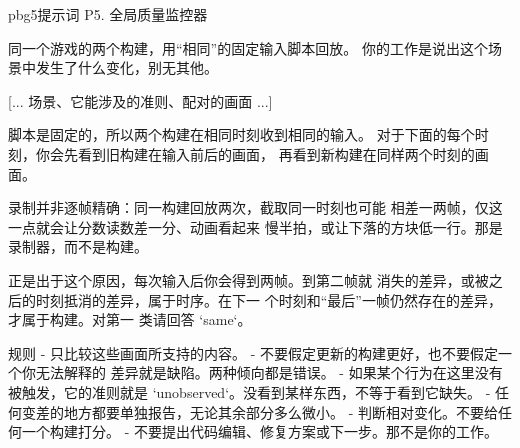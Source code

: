 \begin{promptbox}{pbg5}{提示词 P5. 全局质量监控器}
\begin{PV}
同一个游戏的两个构建，用“相同”的固定输入脚本回放。
你的工作是说出这个场景中发生了什么变化，别无其他。

[... 场景、它能涉及的准则、配对的画面 ...]

脚本是固定的，所以两个构建在相同时刻收到相同的输入。
对于下面的每个时刻，你会先看到旧构建在输入前后的画面，
再看到新构建在同样两个时刻的画面。

录制并非逐帧精确：同一构建回放两次，截取同一时刻也可能
相差一两帧，仅这一点就会让分数读数差一分、动画看起来
慢半拍，或让下落的方块低一行。那是录制器，而不是构建。

正是出于这个原因，每次输入后你会得到两帧。到第二帧就
消失的差异，或被之后的时刻抵消的差异，属于时序。在下一
个时刻和“最后”一帧仍然存在的差异，才属于构建。对第一
类请回答 `same`。

规则
- 只比较这些画面所支持的内容。
- 不要假定更新的构建更好，也不要假定一个你无法解释的
  差异就是缺陷。两种倾向都是错误。
- 如果某个行为在这里没有被触发，它的准则就是
  `unobserved`。没看到某样东西，不等于看到它缺失。
- 任何变差的地方都要单独报告，无论其余部分多么微小。
- 判断相对变化。不要给任何一个构建打分。
- 不要提出代码编辑、修复方案或下一步。那不是你的工作。
\end{PV}
\end{promptbox}
